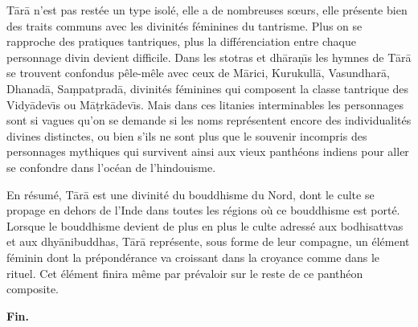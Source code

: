 \documentclass[a4paper, 11pt, oneside, french]{article}
\begin{document}
T\={a}r\={a} n'est pas restée un type isolé, elle a de nombreuses sœurs, elle présente bien des traits communs avec les divinités féminines du tantrisme. Plus on se rapproche des pratiques tantriques, plus la différenciation entre chaque personnage divin devient difficile. Dans les stotras et dh\={a}ra\d{n}\={\i}s les hymnes de T\={a}r\={a} se trouvent confondus pêle-mêle avec ceux de M\={a}rici, Kurukull\={a}, Vasundhar\={a}, Dhanad\={a}, Sa\d{m}patprad\={a}, divinités féminines qui composent la classe tantrique des Vidy\={a}dev\={\i}s ou M\={a}\d{t}rk\={a}dev\={\i}s. Mais dans ces litanies interminables les personnages sont si vagues qu'on se demande si les noms représentent encore des individualités divines distinctes, ou bien s'ils ne sont plus que le souvenir incompris des personnages mythiques qui survivent ainsi aux vieux panthéons indiens pour aller se confondre dans l'océan de l'hindouisme.

En résumé, T\={a}r\={a} est une divinité du bouddhisme du Nord, dont le culte se propage en dehors de l'Inde dans toutes les régions où ce bouddhisme est porté. Lorsque le bouddhisme devient de plus en plus le culte adressé aux bodhisattvas et aux dhy\={a}nibuddhas, T\={a}r\={a} représente, sous forme de leur compagne, un élément féminin dont la prépondérance va croissant dans la croyance comme dans le rituel. Cet élément finira même par prévaloir sur le reste de ce panthéon composite.
\begin{center}
\textbf{Fin.}
\end{center}
\end{document}
